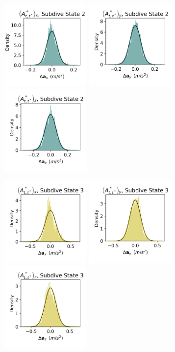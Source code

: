 \documentclass{article}
\begin{document}
\begin{center}
        \includegraphics[width=1.75in]{../Plots/CarHHMM1_empirical_hist_Ax_1.png}
        \includegraphics[width=1.75in]{../Plots/CarHHMM1_empirical_hist_Ay_1.png}
        \includegraphics[width=1.75in]{../Plots/CarHHMM1_empirical_hist_Az_1.png}
        
        \includegraphics[width=1.75in]{../Plots/CarHHMM1_empirical_hist_Ax_2.png}
        \includegraphics[width=1.75in]{../Plots/CarHHMM1_empirical_hist_Ay_2.png}
        \includegraphics[width=1.75in]{../Plots/CarHHMM1_empirical_hist_Az_2.png}
        

\end{center}
\end{document}
